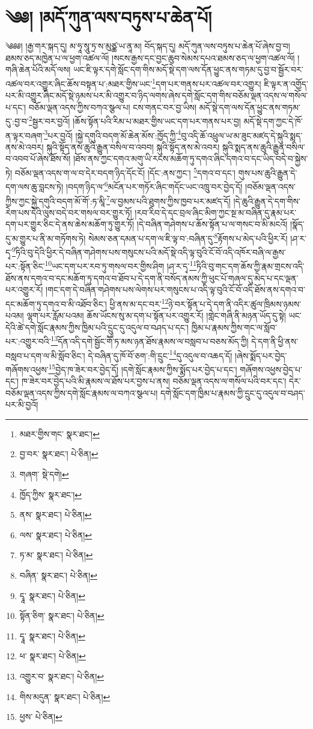 \setcounter{footnote}{0} 
\chapter{༄༅། །མདོ་ཀུན་ལས་བཏུས་པ་ཆེན་པོ།}༄༅༅། །རྒྱ་གར་སྐད་དུ། མ་ཧཱ་སཱུ་ཏྲ་ས་མུཙྪ་ཡ་ནཱ་མ། བོད་སྐད་དུ། མདོ་ཀུན་ལས་བཏུས་པ་ཆེན་པོ་ཞེས་བྱ་བ། ཐམས་ཅད་མཁྱེན་པ་ལ་ཕྱག་འཚལ་ལོ། །སངས་རྒྱས་དང་བྱང་ཆུབ་སེམས་དཔའ་ཐམས་ཅད་ལ་ཕྱག་འཚལ་ལོ། །གཞི་ཆེན་པོའི་མདོ་ལས། ཡང་ཇི་ལྟར་དགེ་སློང་དག་གིས་མདོ་སྡེ་དག་ལས་དོན་ཕྱུང་ནས་གཏམ་དུ་བྱ་བ་སྦྱོར་བར་འཚལ་བར་འགྱུར་ཞིང་ཆོས་བསྟན་པ་:མཐར་གྱིས་ཡང་\footnote{མཐར་གྱིས་གང་  སྣར་ཐང་། }དག་པར་གནས་པར་འཚལ་བར་འགྱུར། ཇི་ལྟར་ན་འགྱོད་པར་མི་འགྱུར་ཞིང་མདོ་སྡེ་ཉམས་པར་མི་འགྱུར་བ་ཉིད་ལགས་ཞེས་དགེ་སློང་དག་གིས་བཅོམ་ལྡན་འདས་ལ་གསོལ་པ་དང་། བཅོམ་ལྡན་འདས་ཀྱིས་བཀའ་སྩལ་པ། ངས་གནང་བར་བྱ་ཡིས། མདོ་སྡེ་དག་ལས་དོན་ཕྱུང་ནས་གཏམ་དུ་:བྱ་བ་\footnote{བྱ་བར་  སྣར་ཐང་།  པེ་ཅིན། }སྦྱར་བར་བྱའོ། །ཆོས་སྟོན་པའི་རིམ་པ་མཐར་གྱིས་ཡང་དག་པར་གནས་པར་བྱ། མདོ་སྡེ་དག་ཀྱང་དེ་ཁོ་ན་ལྟར་བཞག་\footnote{གཞག་  སྡེ་དགེ། }པར་བྱའོ། །སྐྱེ་དགུའི་བདག་མོ་ཆེན་མོས་:ཁྱོད་ཀྱི་\footnote{ཁྱོད་ཀྱིས་  སྣར་ཐང་། }བུ་འདི་ཆོ་འཕྲུལ་ཡ་མ་ཟུང་མཛད་དེ་སྐུའི་སྨད་ནས་མེ་འབར། སྐུའི་སྟོད་ནས་ཆུའི་རྒྱུན་བསིལ་བ་འབབ། སྐུའི་སྟོད་ནས་མེ་འབར། སྐུའི་སྨད་ནས་ཆུའི་རྒྱུན་བསིལ་བ་འབབ་པོ་ཞེས་ཐོས་སོ། །ཐོས་ནས་ཀྱང་དགའ་མགུ་ཡི་རངས་མཆོག་ཏུ་དགའ་ཞིང་དགའ་བ་དང་ཡིད་བདེ་བ་སྐྱེས་ཏེ། བཅོམ་ལྡན་འདས་ག་ལ་བ་དེར་བདག་ཉིད་དོང་ངོ། །དོང་:ནས་ཀྱང་། \footnote{ནས་  སྣར་ཐང་།  པེ་ཅིན། }དགའ་བ་དང་། གུས་པས་ཆུའི་རྒྱུན་དེ་དག་ལས་ཆུ་བླངས་ཏེ། །བདག་ཉིད་ལ་\footnote{ལས་  སྣར་ཐང་།  པེ་ཅིན། }མངོན་པར་གཏོར་ཞིང་གདོང་ཡང་འཁྲུ་བར་བྱེད་དོ། །བཅོམ་ལྡན་འདས་ཀྱིས་ཀྱང་སྐྱེ་དགུའི་བདག་མོ་གོ་:ཏ་མཱི་\footnote{ཏ་མ་  སྣར་ཐང་།  པེ་ཅིན། }ལ་བྱམས་པའི་ཐུགས་ཀྱིས་ཁྱབ་པར་མཛད་དོ། །དེ་ཆུའི་རྒྱུན་དེ་དག་གིས་རེག་པས་དེའི་ལུས་བདེ་བར་གསལ་བར་གྱུར་ཏོ། །རབ་རིབ་དེ་དང་བྲལ་ཞིང་མིག་ཀྱང་སྔ་མ་བཞིན་དུ་རྣམ་པར་དག་པར་གྱུར་ཅིང་དེ་ནས་ཆེས་མཆོག་ཏུ་གྱུར་ཏོ། །དེ་བཞིན་གཤེགས་པ་ཆོས་སྟོན་པ་ལ་གསང་བ་མི་མངའོ། །སྣོད་དུ་མ་གྱུར་པ་ནི་མ་གཏོགས་ཏེ། སེམས་ཅན་དམན་པ་དག་ལ་ཇི་ལྟ་བ་:བཞིན་དུ་\footnote{བཞིན་  སྣར་ཐང་།  པེ་ཅིན། }རྟོགས་པ་མེད་པའི་ཕྱིར་རོ། །ཤ་ར་དྭ་\footnote{དྭཱ་  སྣར་ཐང་།  པེ་ཅིན། }ཏིའི་བུ་དེའི་ཕྱིར་དེ་བཞིན་གཤེགས་པས་གསུངས་པའི་མདོ་སྡེ་འདི་ལྟ་བུའི་ངོ་བོ་འདི་འཁོར་བཞི་ལ་རྒྱས་པར་:སྟོན་ཅིང་\footnote{སྟོན་ཅིག་  སྣར་ཐང་།  པེ་ཅིན། }ཡང་དག་པར་རབ་ཏུ་གསལ་བར་གྱིས་ཤིག །ཤ་ར་དྭ་\footnote{དྭཱ་  སྣར་ཐང་།  པེ་ཅིན། }ཏིའི་བུ་གང་དག་ཆོས་ཀྱི་རྣམ་གྲངས་འདི་ཐོས་ནས་དགའ་བ་དང་མཆོག་ཏུ་དགའ་བ་ཐོབ་པ་དེ་དག་ནི་བསོད་ནམས་ཀྱི་ཕུང་པོ་གཞལ་དུ་མེད་པ་དང་ལྡན་པར་འགྱུར་རོ། །གང་དག་དེ་བཞིན་གཤེགས་པས་ལེགས་པར་གསུངས་པ་འདི་ལྟ་བུའི་ངོ་བོ་འདི་ཐོས་ནས་དགའ་བ་དང་མཆོག་ཏུ་དགའ་བ་མི་འཐོབ་ཅིང་། ཕྱི་ནས་མ་དང་བར་\footnote{ཕ་  སྣར་ཐང་།  པེ་ཅིན། }ཉེ་བར་སྟོན་པ་དེ་དག་ནི་འདིར་ཚུལ་ཁྲིམས་ཉམས་པའམ། ལྷག་པར་རློམ་པའམ། ཆོས་ཡོངས་སུ་མ་དག་པ་སྟོན་པར་འགྱུར་རོ། །གླེང་གཞི་ནི་མཉན་ཡོད་དུ་སྟེ། ཡང་དེའི་ཚེ་དགེ་སློང་རྣམས་ཀྱིས་ཁྱིམ་པའི་དྲུང་དུ་འདུལ་བ་བཤད་པ་དང་། ཁྱིམ་པ་རྣམས་ཀྱིས་གང་ལ་སློབ་པར་:འགྱུར་བའི་\footnote{འགྱུར་བ་  སྣར་ཐང་།  པེ་ཅིན། }དོན་འདི་དགེ་སྦྱོང་གཽ་ཏ་མས་ཉན་ཐོས་རྣམས་ལ་བསླབ་པ་བཅས་མོད་ཀྱི། དེ་དག་ནི་ཕྱི་ནས་བསླབ་པ་དག་ལ་མི་སློབ་ཅིང་། དེ་བཞིན་དུ་ཁོ་བོ་ཅག་:གི་དྲུང་\footnote{གིས་མདུན་  སྣར་ཐང་།  པེ་ཅིན། }དུ་འདུལ་བ་འཆད་དོ། །ཞེས་སྨོད་པར་བྱེད་གཞོགས་འཕྱས་\footnote{ཕྱས་  པེ་ཅིན། }བྱེད་ཁ་ཟེར་བར་བྱེད་དོ། །དགེ་སློང་རྣམས་ཀྱིས་སྨོད་པར་བྱེད་པ་དང་། གཞོགས་འཕྱས་བྱེད་པ་དང་། ཁ་ཟེར་བར་བྱེད་པའི་མི་རྣམས་ལ་ཐོས་པར་བྱས་པ་ནས། བཅོམ་ལྡན་འདས་ལ་གསོལ་པའི་བར་དང་། དེར་བཅོམ་ལྡན་འདས་ཀྱིས་དགེ་སློང་རྣམས་ལ་བཀའ་སྩལ་པ། དགེ་སློང་དག་ཁྱིམ་པ་རྣམས་ཀྱི་དྲུང་དུ་འདུལ་བ་བཤད་པར་མི་བྱའོ། 